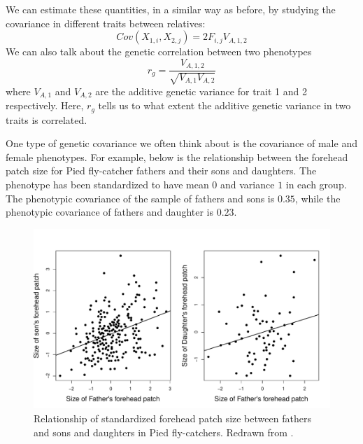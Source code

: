 We can estimate these quantities, in a similar way as before, by
studying the covariance in different traits between relatives: 
\begin{equation}
Cov(X_{1,i},X_{2,j}) = 2 F_{i,j} V_{A,1,2}
\end{equation}
We can also talk about the genetic correlation between two phenotypes
\begin{equation}
r_g = \frac{V_{A,1,2}}{\sqrt{V_{A,1}V_{A,2}}}
\end{equation}
where $V_{A,1}$ and $V_{A,2}$ are the additive genetic variance for trait 1 and 2 respectively. Here, $r_g$ tells us to what extent the additive genetic variance in two traits is correlated.   

One  type of  genetic covariance we often think about is the covariance of male and female phenotypes. For example, below is the relationship between the forehead patch size for Pied fly-catcher fathers and their sons and daughters. The phenotype has been standardized to have mean $0$  and variance $1$ in each group. The phenotypic covariance of the sample of fathers and sons is $0.35$, while the phenotypic covariance of fathers and daughter is $0.23$. 

\begin{figure}
\begin{center}
\includegraphics[width= \textwidth]{Journal_figs/Quant_gen/pied_fly_catcher_sex_genetic_corr/FlyCatcher_genetic_corr.pdf}
\end{center}
\caption{Relationship of standardized forehead patch size between
  fathers and sons and daughters in  Pied fly-catchers. Redrawn from \citeauthor{potti:11}.} \label{fig:FlyCatcher_genetic_corr}   %
\end{figure}

